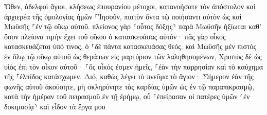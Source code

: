\documentclass{openreader}
\begin{document}
Ὅθεν, ἀδελφοὶ ἅγιοι, κλήσεως ἐπουρανίου μέτοχοι, κατανοήσατε τὸν ἀπόστολον καὶ ἀρχιερέα τῆς ὁμολογίας ἡμῶν ⸀Ἰησοῦν, 
πιστὸν ὄντα τῷ ποιήσαντι αὐτὸν ὡς καὶ Μωϋσῆς ⸀ἐν τῷ οἴκῳ αὐτοῦ. 
πλείονος γὰρ ⸂οὗτος δόξης⸃ παρὰ Μωϋσῆν ἠξίωται καθ’ ὅσον πλείονα τιμὴν ἔχει τοῦ οἴκου ὁ κατασκευάσας αὐτόν· 
πᾶς γὰρ οἶκος κατασκευάζεται ὑπό τινος, ὁ ⸀δὲ πάντα κατασκευάσας θεός. 
καὶ Μωϋσῆς μὲν πιστὸς ἐν ὅλῳ τῷ οἴκῳ αὐτοῦ ὡς θεράπων εἰς μαρτύριον τῶν λαληθησομένων, 
Χριστὸς δὲ ὡς υἱὸς ἐπὶ τὸν οἶκον αὐτοῦ· ⸀ὅς οἶκός ἐσμεν ἡμεῖς, ⸀ἐὰν τὴν παρρησίαν καὶ τὸ καύχημα τῆς ⸀ἐλπίδος κατάσχωμεν. 
Διό, καθὼς λέγει τὸ πνεῦμα τὸ ἅγιον· Σήμερον ἐὰν τῆς φωνῆς αὐτοῦ ἀκούσητε, 
μὴ σκληρύνητε τὰς καρδίας ὑμῶν ὡς ἐν τῷ παραπικρασμῷ, κατὰ τὴν ἡμέραν τοῦ πειρασμοῦ ἐν τῇ ἐρήμῳ, 
οὗ ⸀ἐπείρασαν οἱ πατέρες ὑμῶν ⸂ἐν δοκιμασίᾳ⸃ καὶ εἶδον τὰ ἔργα μου 
\end{document}

